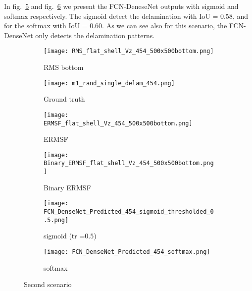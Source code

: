 	In fig.~\ref{fig:predict_454_sigmoid_tr_0.5} and fig.~\ref{fig:predict_454_softmax} we present the FCN-DeneseNet outputs with sigmoid and softmax respectively.
	The sigmoid detect the delamination with IoU = \(0.58\), and for the softmax with IoU = \(0.60\).
	As we can see also for this scenario, the FCN-DenseNet only detects the delamination patterns.
	\begin{figure} [!h]
		\centering
		\begin{subfigure}[b]{0.47\textwidth}
			\centering
			\texttt{[image: RMS\_flat\_shell\_Vz\_454\_500x500bottom.png]}
			\caption{RMS bottom}
			\label{fig:dispersion30deg_direct}
		\end{subfigure}
		\hfill
		\begin{subfigure}[b]{0.47\textwidth}
			\centering
			\texttt{[image: m1\_rand\_single\_delam\_454.png]}
			\caption{Ground truth}
			\label{fig:m1_rand_single_delam_454}
		\end{subfigure}
		\hfill
		\begin{subfigure}[b]{0.47\textwidth}
			\centering
			\texttt{[image: ERMSF\_flat\_shell\_Vz\_454\_500x500bottom.png]}
			\caption{ERMSF}
			\label{fig:ERMSF_flat_shell_Vz_454}
		\end{subfigure}
		\hfill
		\begin{subfigure}[b]{0.47\textwidth}
			\centering
			\texttt{[image: Binary\_ERMSF\_flat\_shell\_Vz\_454\_500x500bottom.png]}
			\caption{Binary ERMSF}
			\label{fig:Binary_ERMSF}
		\end{subfigure}
		\hfill
		\begin{subfigure}[b]{0.47\textwidth}
			\centering
			\texttt{[image: FCN\_DenseNet\_Predicted\_454\_sigmoid\_thresholded\_0.5.png]}
			\caption{sigmoid (tr =\(0.5\))}
			\label{fig:predict_454_sigmoid_tr_0.5}
		\end{subfigure}
		\hfill	
		\begin{subfigure}[b]{0.47\textwidth}
			\centering
			\texttt{[image: FCN\_DenseNet\_Predicted\_454\_softmax.png]}
			\caption{softmax}
			\label{fig:predict_454_softmax}
		\end{subfigure}
		\caption{Second scenario}
		\label{fig:RMS454}
	\end{figure} 
\clearpage
